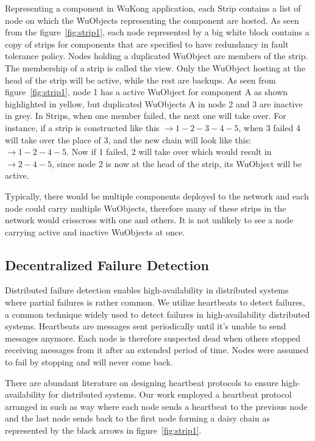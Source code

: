 Representing a component in WuKong application, each Strip contains a list of
node on which the WuObjects representing the component are hosted. As seen from
the figure~\ref{fig:strip1}, each node represented by a big white block contains
a copy of strips for components that are specified to have redundancy in fault
tolerance policy. Nodes holding a duplicated WuObject are members of the strip.
The membership of a strip is called the view. Only the WuObject hosting at the
head of the strip will be active, while the rest are backups.  As seen from
figure~\ref{fig:strip1}, node 1 has a active WuObject for component A as shown
highlighted in yellow, but duplicated WuObjects A in node 2 and 3 are inactive
in grey. In Strips, when one member failed, the next one will take over. For
instance, if a strip is constructed like this $\rightarrow 1-2-3-4-5$, when
3 failed 4 will take over the place of 3, and the new chain will look like this:
$\rightarrow 1-2-4-5$. Now if 1 failed, 2 will take over which would result in
$\rightarrow 2-4-5$, since node 2 is now at the head of the strip, its WuObject
will be active. 

Typically, there would be multiple components deployed to the network and each
node could carry multiple WuObjects, therefore many of these strips in the
network would crisscross with one and others. It is not unlikely to see a node
carrying active and inactive WuObjects at once.

\subsection{Decentralized Failure Detection}
\label{s:dfd}

Distributed failure detection enables high-availability in distributed systems
where partial failures is rather common.  We utilize heartbeats to detect
failures, a common technique widely used to detect failures in high-availability
distributed systems.  Heartbeats are messages sent periodically until it's
unable to send messages anymore. Each node is therefore suspected dead when
others stopped receiving messages from it after an extended period of time.
Nodes were assumed to fail by stopping and will never come back.

There are abundant literature on designing heartbeat protocols to ensure
high-availability for distributed systems. Our work employed a heartbeat
protocol arranged in such as way where each node sends a heartbeat to the
previous node and the last node sends back to the first node forming a daisy
chain as represented by the black arrows in figure~\ref{fig:strip1}.

